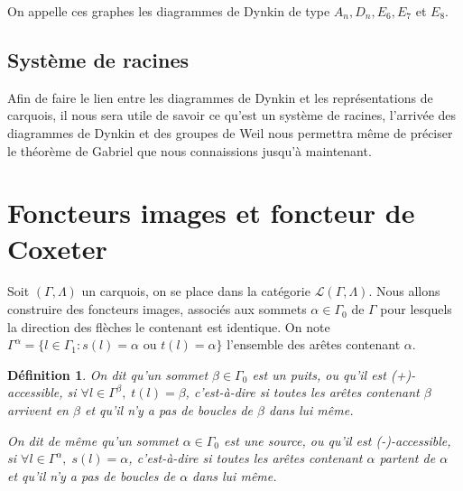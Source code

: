 \documentclass[a4paper,10pt]{article}
\newtheorem{defi}[]{Définition}[section]
\begin{document}
\begin{center}
\end{center}
On appelle ces graphes les diagrammes de Dynkin de type $A_n,D_n,E_6,E_7$ et $E_8$.
\subsection{Système de racines}
Afin de faire le lien entre les diagrammes de Dynkin et les représentations de carquois, il nous sera utile de savoir ce qu'est un système de racines, l'arrivée des diagrammes de Dynkin et des groupes de Weil nous permettra même de préciser le théorème de Gabriel que nous connaissions jusqu'à maintenant.



\clearpage
\section{Foncteurs images et foncteur de Coxeter}
Soit $(\Gamma,\Lambda)$ un carquois, on se place dans la catégorie $\mathscr{L}(\Gamma,\Lambda)$. Nous allons construire des foncteurs images, associés aux sommets $\alpha \in \Gamma_{0}$ de $\Gamma$ pour lesquels la direction des flèches le contenant est identique. On note $\Gamma^{\alpha}=\{ l\in \Gamma_{1} : s(l)=\alpha\text{ ou }t(l)=\alpha\}$ l'ensemble des arêtes contenant $\alpha$.

\begin{defi}
	On dit qu'un sommet $\beta \in \Gamma_{0}$ est un puits, ou qu'il est (+)-accessible, si $\forall l \in \Gamma^{\beta},\; t(l)=\beta$, c'est-à-dire si toutes les arêtes contenant $\beta$ arrivent en $\beta$ et qu'il n'y a pas de boucles de $\beta$ dans lui même.

On dit de même qu'un sommet $\alpha \in \Gamma_{0}$ est une source, ou qu'il est (-)-accessible, si $\forall l \in \Gamma^{\alpha},\; s(l)=\alpha$, c'est-à-dire si toutes les arêtes contenant $\alpha$ partent de $\alpha$ et qu'il n'y a pas de boucles de $\alpha$ dans lui même.
\end{defi}
\end{document}
